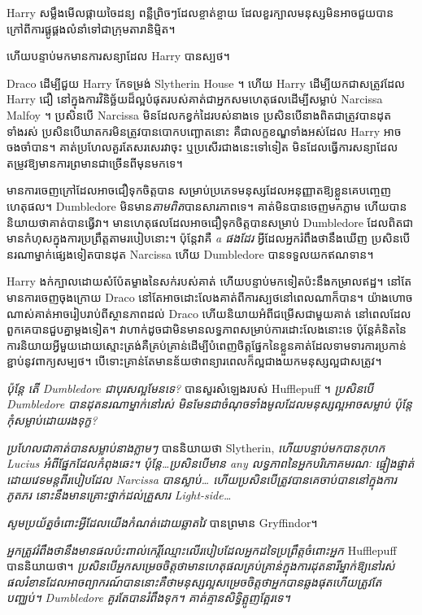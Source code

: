 Harry សម្លឹងមើលផ្កាយចៃដន្យ ពន្លឺព្រិចៗដែលខ្ចាត់ខ្ចាយ ដែលខួរក្បាលមនុស្សមិនអាចជួយបាន ក្រៅពីការផ្គូផ្គងលំនាំទៅជាក្រុមតារានិម្មិត។

ហើយបន្ទាប់មកមានការសន្យាដែល Harry បានស្បថ។

Draco ដើម្បីជួយ Harry កែទម្រង់ Slytherin House ។ ហើយ Harry ដើម្បីយកជាសត្រូវដែល Harry ជឿ នៅក្នុងការវិនិច្ឆ័យដ៏ល្អបំផុតរបស់គាត់ជាអ្នកសមហេតុផលដើម្បីសម្លាប់ Narcissa Malfoy ។ ប្រសិនបើ Narcissa មិនដែលកខ្វក់ដៃរបស់នាងទេ ប្រសិនបើនាងពិតជាត្រូវបានដុតទាំងរស់ ប្រសិនបើឃាតករមិនត្រូវបានបោកបញ្ឆោតនោះ គឺជាលក្ខខណ្ឌទាំងអស់ដែល Harry អាចចងចាំបាន។ គាត់ប្រហែលគួរតែសរសេរវាចុះ ឬប្រសើរជាងនេះទៅទៀត មិនដែលធ្វើការសន្យាដែលតម្រូវឱ្យមានការព្រមានជាច្រើនពីមុនមកទេ។

មាន​ការ​ចេញ​ក្រៅ​ដែល​អាច​ជឿ​ទុក​ចិត្ត​បាន សម្រាប់​ប្រភេទ​មនុស្ស​ដែល​អនុញ្ញាត​ឱ្យ​ខ្លួន​គេ​បញ្ចេញ​ហេតុផល។ Dumbledore មិនមាន\emph{តាមពិត}បានសារភាពទេ។ គាត់​មិន​បាន​ចេញ​មក​ភ្លាម ហើយ​បាន​និយាយ​ថា​គាត់​បាន​ធ្វើ​វា​។ មានហេតុផលដែលអាចជឿទុកចិត្តបានសម្រាប់ Dumbledore ដែលពិតជាមានកំហុសក្នុងការប្រព្រឹត្តតាមរបៀបនោះ។ ប៉ុន្តែវាគឺ \emph{a ផងដែរ} អ្វីដែលអ្នករំពឹងថានឹងឃើញ ប្រសិនបើនរណាម្នាក់ផ្សេងទៀតបានដុត Narcissa ហើយ Dumbledore បានទទួលយកឥណទាន។

Harry ងក់​ក្បាល​ដោយ​សំប៉ែត​ម្ខាង​នៃ​សក់​របស់​គាត់ ហើយ​បន្ទាប់​មក​ទៀត​ប៉ះ​នឹង​កម្រាល​ឥដ្ឋ។ នៅតែមានការចេញចុងក្រោយ Draco នៅតែអាចដោះលែងគាត់ពីការស្បថនៅពេលណាក៏បាន។ យ៉ាងហោចណាស់គាត់អាចរៀបរាប់ពីស្ថានភាពដល់ Draco ហើយនិយាយអំពីជម្រើសជាមួយគាត់ នៅពេលដែលពួកគេបានជួបគ្នាម្តងទៀត។ វាហាក់ដូចជាមិនមានលទ្ធភាពសម្រាប់ការដោះលែងនោះទេ ប៉ុន្តែគំនិតនៃការនិយាយអ្វីមួយដោយស្មោះត្រង់គឺគ្រប់គ្រាន់ដើម្បីបំពេញចិត្តផ្នែកនៃខ្លួនគាត់ដែលទាមទារការប្រកាន់ខ្ជាប់នូវពាក្យសម្បថ។ បើ​ទោះ​គ្រាន់​តែ​មាន​ន័យ​ថា​ពន្យារ​ពេល​ក៏​ល្អ​ជាង​យក​មនុស្ស​ល្អ​ជា​សត្រូវ។

\emph{ប៉ុន្តែ \emph{តើ} Dumbledore ជាបុរសល្អមែនទេ?} បានសួរសំឡេងរបស់ Hufflepuff ។ \emph{ប្រសិនបើ Dumbledore បានដុតនរណាម្នាក់នៅរស់ មិនមែនជាចំណុចទាំងមូលដែលមនុស្សល្អអាចសម្លាប់ ប៉ុន្តែកុំសម្លាប់ដោយរងទុក្ខ?}

\emph{ប្រហែលជាគាត់បានសម្លាប់នាងភ្លាមៗ} បាននិយាយថា Slytherin, \emph{ ហើយបន្ទាប់មកបានកុហក Lucius អំពីផ្នែកដែលកំពុងឆេះ។ ប៉ុន្តែ…ប្រសិនបើមាន \emph{any} លទ្ធភាពនៃអ្នកបរិភោគមរណៈ ផ្ទៀងផ្ទាត់ដោយវេទមន្តពីរបៀបដែល Narcissa បានស្លាប់… ហើយប្រសិនបើត្រូវបានគេចាប់បាននៅក្នុងការភូតភរ នោះនឹងមានគ្រោះថ្នាក់ដល់គ្រួសារ Light-side…}

\emph{សូមប្រយ័ត្នចំពោះអ្វីដែលយើងកំណត់ដោយឆ្លាតវៃ} បានព្រមាន Gryffindor។

\emph{អ្នកត្រូវរំពឹងថានឹងមានផលប៉ះពាល់កេរ្តិ៍ឈ្មោះលើរបៀបដែលអ្នកដទៃប្រព្រឹត្តចំពោះអ្នក} Hufflepuff បាននិយាយថា។ \emph{ប្រសិនបើអ្នកសម្រេចចិត្តថាមានហេតុផលគ្រប់គ្រាន់ក្នុងការដុតនារីម្នាក់ឱ្យនៅរស់ ផលរំខានដែលអាចព្យាករណ៍បាននោះគឺថាមនុស្សល្អសម្រេចចិត្តថាអ្នកបានឆ្លងផុតហើយត្រូវតែបញ្ឈប់។ Dumbledore គួរ​តែ​បាន​រំពឹង​ទុក។ គាត់គ្មានសិទ្ធិត្អូញត្អែរទេ។}

